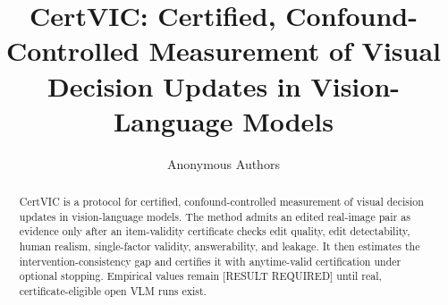 \documentclass{article}
\title{CertVIC: Certified, Confound-Controlled Measurement of Visual Decision Updates in Vision-Language Models}
\author{Anonymous Authors}
\date{}
\begin{document}
\maketitle

\begin{abstract}
CertVIC is a protocol for certified, confound-controlled measurement of visual
decision updates in vision-language models. The method admits an edited
real-image pair as evidence only after an item-validity certificate checks edit
quality, edit detectability, human realism, single-factor validity,
answerability, and leakage. It then estimates the intervention-consistency gap
and certifies it with anytime-valid certification under optional stopping.
Empirical values remain [RESULT REQUIRED] until real, certificate-eligible open
VLM runs exist.
\end{abstract}












\end{document}
